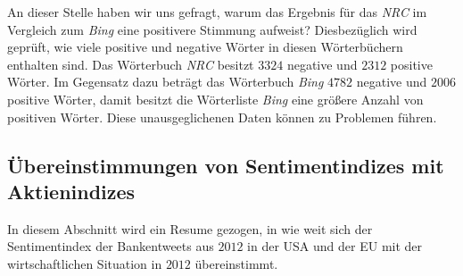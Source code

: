 An dieser Stelle haben wir uns gefragt, warum das Ergebnis für das \textit{NRC} im Vergleich zum \textit{Bing} eine positivere Stimmung aufweist? Diesbezüglich wird geprüft, wie viele positive und negative Wörter in diesen Wörterbüchern enthalten sind. Das Wörterbuch \textit{NRC} besitzt $3324$ negative und $2312$ positive Wörter. Im Gegensatz dazu beträgt das Wörterbuch \textit{Bing} $4782$ negative und $2006$ positive Wörter, damit besitzt die Wörterliste \textit{Bing} eine größere Anzahl von positiven Wörter. Diese unausgeglichenen Daten können zu Problemen führen. 

\subsection{Übereinstimmungen von Sentimentindizes mit Aktienindizes}\label{ueberein}
In diesem Abschnitt wird ein Resume gezogen, in wie weit sich der Sentimentindex der Bankentweets aus $2012$ in der USA und der EU mit der wirtschaftlichen Situation in $2012$ übereinstimmt. 


